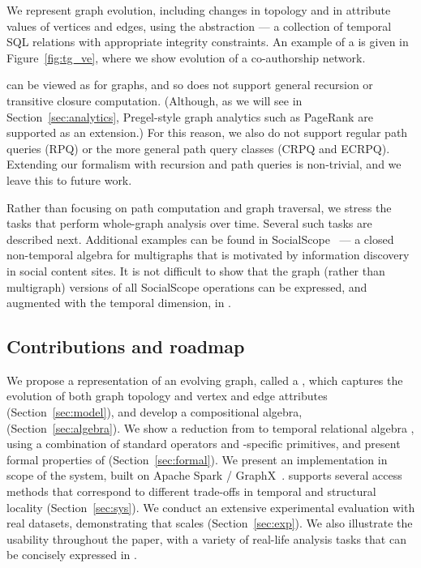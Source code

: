 
We represent graph evolution, including changes in topology and in
attribute values of vertices and edges, using the \tg abstraction ---
a collection of temporal SQL relations with appropriate integrity
constraints.  An example of a \tg is given in Figure~\ref{fig:tg_ve},
where we show evolution of a co-authorship network.

\tga can be viewed as \tra for graphs, and so does not support general
recursion or transitive closure computation. (Although, as we will see
in Section~\ref{sec:analytics}, Pregel-style graph analytics such as
PageRank are supported as an extension.)  For this reason, we also do
not support regular path queries (RPQ) or the more general path query
classes (CRPQ and ECRPQ).  Extending our formalism with recursion and
path queries is non-trivial, and we leave this to future work.

Rather than focusing on path computation and graph traversal, we
stress the tasks that perform whole-graph analysis over time.  Several
such tasks are described next.  Additional examples can be found in
SocialScope~\cite{Amer-Yahia2009} --- a closed non-temporal algebra
for multigraphs that is motivated by information discovery in social
content sites.  It is not difficult to show that the graph (rather
than multigraph) versions of all SocialScope operations can be
expressed, and augmented with the temporal dimension, in \tga.



\subsection{Contributions and roadmap}

%
%
 We propose a representation of an evolving graph, called a \tg, which
 captures the evolution of both graph topology and vertex and edge
 attributes (Section~\ref{sec:model}), and develop a compositional \tg
 algebra, \tga (Section~\ref{sec:algebra}).
%
We show a reduction from \tga to temporal relational algebra
  \tra, using a combination of standard operators and \tg-specific
  primitives, and present formal properties of \tga
  (Section~\ref{sec:formal}).
%
We present an implementation in scope of the \ql system, built
  on Apache Spark / GraphX~\cite{DBLP:conf/osdi/GonzalezXDCFS14}. \ql
  supports several access methods that correspond to different
  trade-offs in temporal and structural locality
  (Section~\ref{sec:sys}).
%
We conduct an extensive experimental evaluation with real datasets,
demonstrating that \ql scales (Section~\ref{sec:exp}).  We also
illustrate the usability throughout the paper, with a variety of
real-life analysis tasks that can be concisely expressed in \tga.



